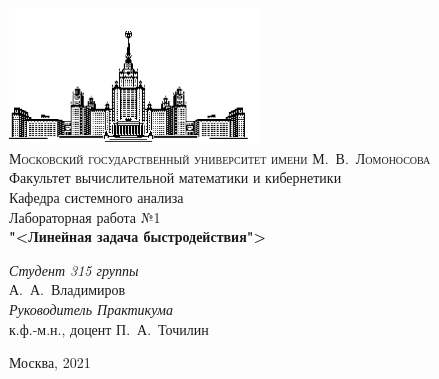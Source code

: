 \documentclass[oneside,final,11pt]{article}
\begin{document}
	\begin{titlepage}
		\begin{centering}
			\includegraphics[width=0.5\textwidth]{msu.png}\\
			{\scshape Московский государственный университет имени М.~В.~Ломоносова}\\
			Факультет вычислительной математики и кибернетики\\
			Кафедра системного анализа\\
			\vfill
			{\LARGE Лабораторная работа №1}\\
			\vspace{1cm}
			{\Huge\bfseries "<Линейная задача быстродействия">\\}
		\end{centering}
		\vspace{1cm}
		\begin{flushright}
			\begin{large}
				{\itshape Студент 315 группы\\}
				А.~А.~Владимиров\\
				\vspace{5mm}
				{\itshape Руководитель Практикума\\}
				к.ф.-м.н., доцент П.~А.~Точилин\\
			\end{large}
		\end{flushright}
		\vfill
		\begin{centering}
			Москва, 2021\\ 
		\end{centering}
	\newpage
	\end{titlepage}
	\setcounter{page}{2}
	
	\tableofcontents

	\newpage
\end{document}
